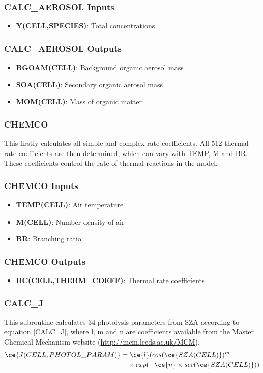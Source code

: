 \subsubsection{CALC\_AEROSOL Inputs}
\begin{itemize}
    \item \textbf{Y(CELL,SPECIES)}: Total concentrations
\end{itemize}

\subsubsection{CALC\_AEROSOL Outputs}
\begin{itemize}
    \item \textbf{BGOAM(CELL)}: Background organic aerosol mass
    \item \textbf{SOA(CELL)}: Secondary organic aerosol mass
    \item \textbf{MOM(CELL)}: Mass of organic matter
\end{itemize}

\subsubsection{CHEMCO}
This firstly calculates all simple and complex rate coefficients. All 512 thermal rate coefficients are then determined, which can vary with TEMP, M and BR. These coefficients control the rate of thermal reactions in the model.

\subsubsection{CHEMCO Inputs}
\begin{itemize}
    \item \textbf{TEMP(CELL)}: Air temperature
    \item \textbf{M(CELL)}: Number density of air
    \item \textbf{BR}: Branching ratio
\end{itemize}

\subsubsection{CHEMCO Outputs}
\begin{itemize}
    \item \textbf{RC(CELL,THERM\_COEFF)}: Thermal rate coefficients
\end{itemize}

\subsubsection{CALC\_J}
This subroutine calculates 34 photolysis parameters from SZA according to equation \eqref{CALC_J}, where l, m and n are coefficients available from the Master Chemical Mechanism website (\url{http://mcm.leeds.ac.uk/MCM}).
\begin{align}
    \ce{J(CELL,PHOTOL\_PARAM)} &= \ce{l}(cos(\ce{SZA(CELL)})^{m} \notag \\
    &\quad \times exp(-\ce{n} \times sec(\ce{SZA(CELL)}))
\end{align}
